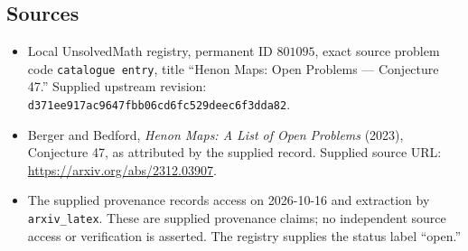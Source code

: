 \documentclass[11pt]{article}
\begin{document}
\subsection{Sources}
\begin{itemize}
\item Local UnsolvedMath registry, permanent ID \(801095\), exact source problem code \texttt{catalogue entry}, title ``Henon Maps: Open Problems --- Conjecture 47.'' Supplied upstream revision: \texttt{d371ee917ac9647fbb06cd6fc529deec6f3dda82}.
\item Berger and Bedford, \emph{Henon Maps: A List of Open Problems} (2023), Conjecture 47, as attributed by the supplied record. Supplied source URL: \url{https://arxiv.org/abs/2312.03907}.
\item The supplied provenance records access on 2026-10-16 and extraction by \texttt{arxiv\_latex}. These are supplied provenance claims; no independent source access or verification is asserted. The registry supplies the status label ``open.''
\end{itemize}
\end{document}
